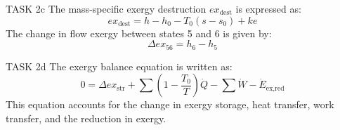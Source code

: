 TASK 2c  
The mass-specific exergy destruction \( ex_{\text{dest}} \) is expressed as:  
\[
ex_{\text{dest}} = h - h_0 - T_0(s - s_0) + ke
\]  
The change in flow exergy between states 5 and 6 is given by:  
\[
\Delta ex_{56} = h_6 - h_5
\]  

TASK 2d  
The exergy balance equation is written as:  
\[
0 = \Delta ex_{\text{str}} + \sum \left( 1 - \frac{T_0}{T} \right) \dot{Q} - \sum \dot{W} - \dot{E}_{\text{ex,red}}
\]  
This equation accounts for the change in exergy storage, heat transfer, work transfer, and the reduction in exergy.